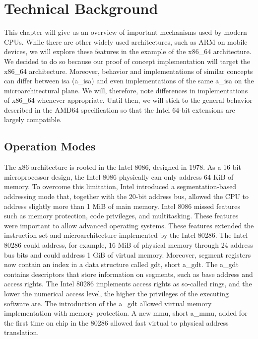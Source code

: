 \section{Technical Background}
\label{sec:state:technical}
This chapter will give us an overview of important mechanisms used by modern
CPUs. While there are other widely used architectures, such as ARM on mobile
devices, we will explore these features in the example of the x86\_64
architecture. \\

We decided to do so because our proof of concept implementation will target the
x86\_64 architecture. Moreover, behavior and implementations of similar concepts
can differ between \gls{isa} (\acrshort{a_isa}) and even implementations of the
same \acrshort{a_isa} on the microarchitectural plane. We will, therefore, note
differences in implementations of x86\_64 whenever appropriate. Until then, we
will stick to the general behavior described in the AMD64 specification so that
the Intel 64-bit extensions are largely compatible.

\subsection{Operation Modes}
\label{sec:state:technical:modes}
The x86 architecture is rooted in the Intel 8086, designed in 1978. As a 16-bit
microprocessor design, the Intel 8086 physically can only address 64 KiB of
memory. To overcome this limitation, Intel introduced a segmentation-based
addressing mode that, together with the 20-bit address bus, allowed the CPU to
address slightly more than 1 MiB of main memory. Intel 8086 missed features such
as memory protection, code privileges, and multitasking. These features were
important to allow advanced operating systems. These features extended the
instruction set and microarchitecture implemented by the Intel 80286. The Intel
80286 could address, for example, 16 MiB of physical memory through 24 address
bus bits and could address 1 GiB of virtual memory. Moreover, segment registers
now contain an index in a data structure called \gls{gdt}, short
\acrshort{a_gdt}. The \acrshort{a_gdt} contains descriptors that store
information on segments, such as base address and access rights. The Intel 80286
implements access rights as so-called rings, and the lower the numerical access
level, the higher the privileges of the executing software are. The introduction
of the \acrshort{a_gdt} allowed virtual memory implementation with memory
protection. A new \gls{mmu}, short \acrshort{a_mmu}, added for the first time on
chip in the 80286 allowed fast virtual to physical address translation. \\

